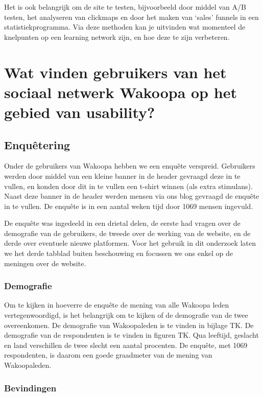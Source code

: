 \documentclass[a4paper, 10pt, pdftex]{report}
\begin{document}
    Het is ook belangrijk om de site te testen, bijvoorbeeld door middel van A/B testen, het analyseren van clickmaps en door het maken van `sales' funnels in een statistiekprogramma. Via deze methoden kan je uitvinden wat momenteel de knelpunten op een learning network zijn, en hoe deze te zijn verbeteren.


  \newpage
  \chapter{Wat vinden gebruikers van het sociaal netwerk Wakoopa op het gebied van usability?}
    \label{userchapter}
    \newpage
    \section{Enqu\^etering}
    Onder de gebruikers van Wakoopa hebben we een enqu\^ete verspreid. Gebruikers werden door middel van een kleine banner in de header gevraagd deze in te vullen, en konden door dit in te vullen een t-shirt winnen (als extra stimulans). Naast deze banner in de header werden mensen via ons blog gevraagd de enqu\^ete in te vullen. De enqu\^ete is in een aantal weken tijd door 1069 mensen ingevuld.

    De enqu\^ete was ingedeeld in een drietal delen, de eerste had vragen over de demografie van de gebruikers, de tweede over de werking van de website, en de derde over eventuele nieuwe platformen. Voor het gebruik in dit onderzoek laten we het derde tabblad buiten beschouwing en focussen we ons enkel op de meningen over de website.

      \subsection{Demografie}
        Om te kijken in hoeverre de enqu\^ete de mening van alle Wakoopa leden vertegenwoordigd, is het belangrijk om te kijken of de demografie van de twee overeenkomen. De demografie van Wakoopaleden is te vinden in bijlage TK. De demografie van de respondenten is te vinden in figuren TK. Qua leeftijd, geslacht en land verschillen de twee slecht een aantal procenten. De enqu\^ete, met 1069 respondenten, is daarom een goede graadmeter van de mening van Wakoopaleden.

      \subsection{Bevindingen}

  \newpage
\end{document}
